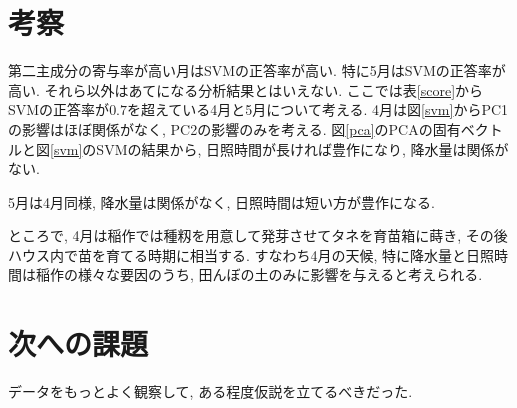 \documentclass{jarticle}
\begin{document}
\hypertarget{header-n2056}{%
\section{考察}\label{header-n2056}}

第二主成分の寄与率が高い月はSVMの正答率が高い. 特に5月はSVMの正答率が高い. それら以外はあてになる分析結果とはいえない. ここでは表\ref{score}からSVMの正答率が$0.7$を超えている4月と5月について考える. 
4月は図\ref{svm}からPC1の影響はほぼ関係がなく, PC2の影響のみを考える. 図\ref{pca}のPCAの固有ベクトルと図\ref{svm}のSVMの結果から, 日照時間が長ければ豊作になり, 降水量は関係がない.

5月は4月同様, 降水量は関係がなく, 日照時間は短い方が豊作になる.

ところで, 4月は稲作では種籾を用意して発芽させてタネを育苗箱に蒔き, その後ハウス内で苗を育てる時期に相当する. すなわち4月の天候, 特に降水量と日照時間は稲作の様々な要因のうち, 田んぼの土のみに影響を与えると考えられる. 

%

\section{次への課題}

データをもっとよく観察して, ある程度仮説を立てるべきだった. 
\end{document}
